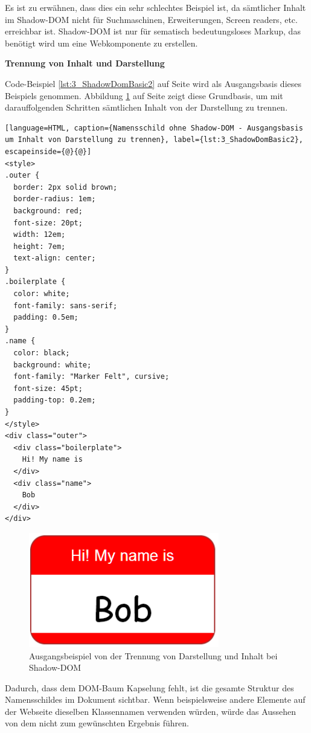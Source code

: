 Es ist zu erwähnen, dass dies ein sehr schlechtes Beispiel ist, da sämtlicher Inhalt im Shadow-DOM nicht für Suchmaschinen, Erweiterungen, Screen readers, etc. erreichbar ist. Shadow-DOM ist nur für sematisch bedeutungsloses Markup, das benötigt wird um eine Webkomponente zu erstellen.

\textbf{Trennung von Inhalt und Darstellung}

Code-Beispiel \ref{lst:3_ShadowDomBasic2} auf Seite \pageref{lst:3_ShadowDomBasic2} wird als Ausgangsbasis dieses Beispiels genommen. Abbildung \ref{fig:3_ShadowDom2} auf Seite \pageref{fig:3_ShadowDom2} zeigt diese Grundbasis, um mit darauffolgenden Schritten sämtlichen Inhalt von der Darstellung zu trennen.

\begin{lstlisting}[language=HTML, caption={Namensschild ohne Shadow-DOM - Ausgangsbasis um Inhalt von Darstellung zu trennen}, label={lst:3_ShadowDomBasic2}, escapeinside={@}{@}]
<style>
.outer {
  border: 2px solid brown;
  border-radius: 1em;
  background: red;
  font-size: 20pt;
  width: 12em;
  height: 7em;
  text-align: center;
}
.boilerplate {
  color: white;
  font-family: sans-serif;
  padding: 0.5em;
}
.name {
  color: black;
  background: white;
  font-family: "Marker Felt", cursive;
  font-size: 45pt;
  padding-top: 0.2em;
}
</style>
<div class="outer">
  <div class="boilerplate">
    Hi! My name is
  </div>
  <div class="name">
    Bob
  </div>
</div>
\end{lstlisting}

\begin{figure}[h]
\centering
\includegraphics[height=5.0cm]{images/SS3.png}
\caption[
  Ausgangsbeispiel von der Trennung von Darstellung und Inhalt bei Shadow-DOM
]{Ausgangsbeispiel von der Trennung von Darstellung und Inhalt bei Shadow-DOM}
\label{fig:3_ShadowDom2}
\end{figure}

Dadurch, dass dem DOM-Baum Kapselung fehlt, ist die gesamte Struktur des Namensschildes im Dokument sichtbar. Wenn beispielsweise andere Elemente auf der Webseite dieselben Klassennamen verwenden würden, würde das Aussehen von dem nicht zum gewünschten Ergebnis führen.

